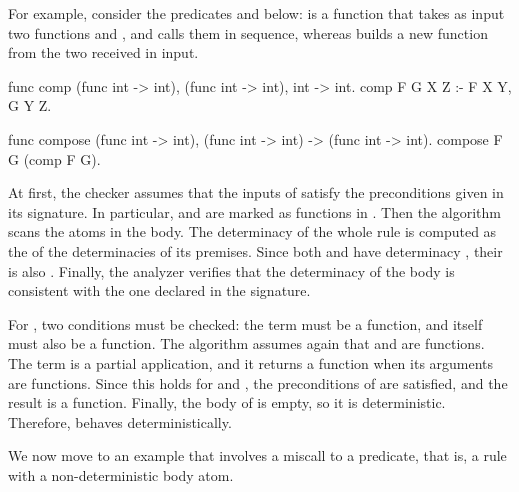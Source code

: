 For example, consider the predicates  and  below: 
 is a function
that takes
as input two functions  and , and
calls them in sequence, whereas  builds a new function
from the two received in input.
%
\begin{elpicode}
func comp (func int -> int), (func int -> int), int -> int.
comp F G X Z :- F X Y, G Y Z.

func compose (func int -> int), (func int -> int) -> (func int -> int).
compose F G (comp F G).
\end{elpicode}


At first, the checker assumes that the inputs of  satisfy the
preconditions given in its signature. In particular,  and 
are marked as functions in \ctx. Then the algorithm scans the atoms in
the body. The determinacy of the whole rule is computed as the \maxT of
the determinacies of its premises. Since both  and
 have determinacy \detI, their \maxT is also \detI. Finally,
the analyzer verifies that the determinacy of the body is consistent
with the one declared in the signature.

For , two conditions must be checked: the term
 must be a function, and  itself must also be
a function. The algorithm assumes again that  and  are
functions. The term  is a partial application, and it
returns a function when its arguments are functions. Since this holds
for  and , the preconditions of  are satisfied,
and the result is a function.
Finally, the body of  is empty, so it is deterministic.
Therefore,  behaves deterministically.

We now move to an example that involves a miscall to a predicate, that is,
a rule with a non-deterministic body atom.

